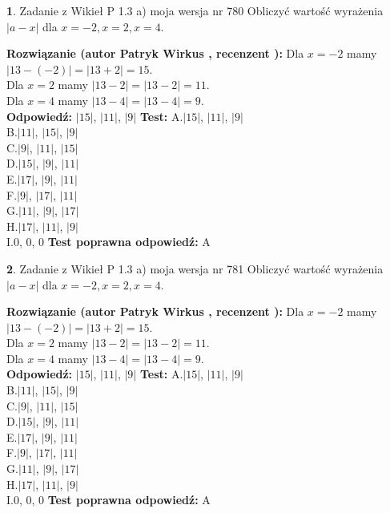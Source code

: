 \documentclass[12pt, a4paper]{article}
\theoremstyle{definition} %
\newtheorem{zad}{}
\newcommand{\zadStart}[1]{\begin{zad}#1\newline}
\newcommand{\zadStop}{\end{zad}}
\newcommand{\rozwStart}[2]{\noindent \textbf{Rozwiązanie (autor #1 , recenzent #2): }\newline}
\newcommand{\rozwStop}{\newline}
\newcommand{\odpStart}{\noindent \textbf{Odpowiedź:}\newline}
\newcommand{\odpStop}{\newline}
\newcommand{\testStart}{\noindent \textbf{Test:}\newline}
\newcommand{\testStop}{\newline}
\newcommand{\kluczStart}{\noindent \textbf{Test poprawna odpowiedź:}\newline}
\newcommand{\kluczStop}{\newline}
\begin{document}
\zadStart{Zadanie z Wikieł P 1.3 a) moja wersja nr 780}
Obliczyć wartość wyrażenia $|a - x|$ dla $x=-2,x=2,x=4$.
\zadStop
\rozwStart{Patryk Wirkus}{}
Dla $x = -2$ mamy $|13 - (-2)| = |13 + 2| = 15$.\\
Dla $x = 2$ mamy $|13 - 2| = |13 - 2| = 11$.\\
Dla $x = 4$ mamy $|13 - 4| = |13 - 4| = 9$.\\
\rozwStop
\odpStart
$|15|$, $|11|$, $|9|$
\odpStop
\testStart
A.$|15|$, $|11|$, $|9|$\\
B.$|11|$, $|15|$, $|9|$\\
C.$|9|$, $|11|$, $|15|$\\
D.$|15|$, $|9|$, $|11|$\\
E.$|17|$, $|9|$, $|11|$\\
F.$|9|$, $|17|$, $|11|$\\
G.$|11|$, $|9|$, $|17|$\\
H.$|17|$, $|11|$, $|9|$\\
I.$0$, $0$, $0$
\testStop
\kluczStart
A
\kluczStop



\zadStart{Zadanie z Wikieł P 1.3 a) moja wersja nr 781}
Obliczyć wartość wyrażenia $|a - x|$ dla $x=-2,x=2,x=4$.
\zadStop
\rozwStart{Patryk Wirkus}{}
Dla $x = -2$ mamy $|13 - (-2)| = |13 + 2| = 15$.\\
Dla $x = 2$ mamy $|13 - 2| = |13 - 2| = 11$.\\
Dla $x = 4$ mamy $|13 - 4| = |13 - 4| = 9$.\\
\rozwStop
\odpStart
$|15|$, $|11|$, $|9|$
\odpStop
\testStart
A.$|15|$, $|11|$, $|9|$\\
B.$|11|$, $|15|$, $|9|$\\
C.$|9|$, $|11|$, $|15|$\\
D.$|15|$, $|9|$, $|11|$\\
E.$|17|$, $|9|$, $|11|$\\
F.$|9|$, $|17|$, $|11|$\\
G.$|11|$, $|9|$, $|17|$\\
H.$|17|$, $|11|$, $|9|$\\
I.$0$, $0$, $0$
\testStop
\kluczStart
A
\kluczStop
\end{document}
